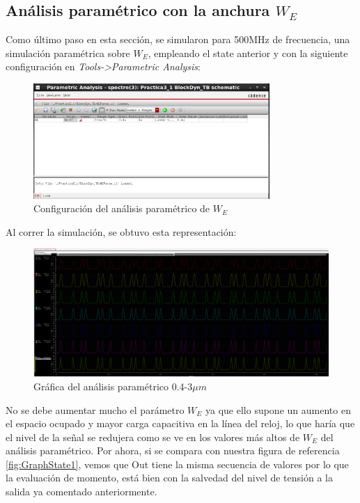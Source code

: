 \subsection{Análisis paramétrico con la anchura $W_E$}
Como último paso en esta sección, se simularon para 500MHz de frecuencia, una simulación paramétrica sobre $W_E$, empleando el state anterior y con la siguiente configuración en \textit{Tools->Parametric Analysis}:
\begin{figure}[h]%
\begin{center}
\includegraphics[width=0.8\textwidth]{figures/WEParamConfig.PNG}
\caption{Configuración del análisis paramétrico de $W_E$}
\label{fig:WEConfig}
\end{center}
\end{figure} \newline
Al correr la simulación, se obtuvo esta representación:
\begin{figure}[h]%
\hspace{-10mm}
\includegraphics[width=1.2\textwidth]{figures/WEGraph.PNG}
\caption{Gráfica del análisis paramétrico 0.4-3$\mu m$}
\label{fig:WEGraph}
\end{figure} \newline
No se debe aumentar mucho el parámetro $W_E$ ya que ello supone un aumento en el espacio ocupado y mayor carga capacitiva en la línea del reloj, lo que haría que el nivel de la señal se redujera como se ve en los valores más altos de $W_E$ del análisis paramétrico. Por ahora, si se compara con nuestra figura de referencia \ref{fig:GraphState1}, vemos que Out tiene la misma secuencia de valores por lo que la evaluación de momento, está bien con la salvedad del nivel de tensión a la salida ya comentado anteriormente.
